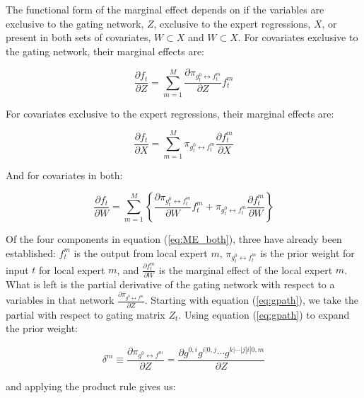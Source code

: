 \documentclass[12pt]{article}
\newcommand{\gateprod}[2]{\pi_{#1 \longleftrightarrow #2}}
\begin{document}
The functional form of the marginal effect depends on if the variables are
exclusive to the gating network, $Z$, exclusive to the expert
regressions, $X$, or present in both sets of covariates,
$W \subset X$ and $W \subset X$. For covariates 
exclusive to the gating network, their marginal effects are:

\begin{equation} \label{eq:ME_gating}
  \frac{\partial f_{t}}{\partial Z} = \sum_{m=1}^{M} \frac{\partial \gateprod{g^{0}_{t}}{f^{m}_{t}}}{{\partial Z}}f^{m}_{t}
\end{equation}

For covariates exclusive to the expert regressions, their marginal effects
are:

\begin{equation} \label{eq:ME_expert}
  \frac{\partial f_{t}}{\partial X} = \sum_{m=1}^{M} \gateprod{g^{0}_{t}}{f^{m}_{t}} \frac{\partial f^{m}_{t}}{{\partial X}}
\end{equation}

And for covariates in both:

\begin{equation} \label{eq:ME_both}
  \frac{\partial f_{t}}{\partial W} = \sum_{m=1}^{M} \left\{ \frac{\partial \gateprod{g^{0}_{t}}{f^{m}_{t}}}{{\partial W}}f^{m}_{t} + \gateprod{g^{0}_{t}}{f^{m}_{t}} \frac{\partial f^{m}_{t}}{{\partial W}} \right\}
\end{equation}

Of the four components in equation (\ref{eq:ME_both}), three have already
been established: $f_{t}^{m}$ is the output from local expert $m$,
$\gateprod{g^{0}_{t}}{f^{m}_{t}}$ is the prior weight for input $t$
for local expert $m$, and $\frac{\partial f^{m}_{t}}{{\partial W}}$
is the marginal effect of the local expert $m$. What is left is the
partial derivative of the gating network with respect to a variables
in that network $\frac{\partial \gateprod{g^{0}}{f^{m}}}{\partial Z}$.
Starting with equation (\ref{eq:gpath}), we take the partial with
respect to gating matrix $Z_{t}$. Using equation (\ref{eq:gpath})
to expand the prior weight:

\begin{equation}
  \delta^{m} \equiv \frac{\partial \gateprod{g^{0}}{f^{m}}}{\partial Z} = \frac{\partial g^{0, i} g^{i|0, j} \cdots g^{k|\cdots|j|i|0, m}}{\partial Z}
\end{equation}

and applying the product rule gives us:
\end{document}
